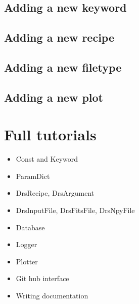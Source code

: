 \documentclass[a4paper,10pt,english]{report}
\begin{document}
\subsection{Adding a new keyword}
\label{\detokenize{dev/adding_new_keyword:adding-a-new-keyword}}\label{\detokenize{dev/adding_new_keyword:adding-new-keyword}}\label{\detokenize{dev/adding_new_keyword::doc}}

\subsection{Adding a new recipe}
\label{\detokenize{dev/adding_new_recipe:adding-a-new-recipe}}\label{\detokenize{dev/adding_new_recipe:add-new-recipe}}\label{\detokenize{dev/adding_new_recipe::doc}}

\subsection{Adding a new filetype}
\label{\detokenize{dev/adding_new_filetype:adding-a-new-filetype}}\label{\detokenize{dev/adding_new_filetype:add-new-filetype}}\label{\detokenize{dev/adding_new_filetype::doc}}

\subsection{Adding a new plot}
\label{\detokenize{dev/adding_new_plot:adding-a-new-plot}}\label{\detokenize{dev/adding_new_plot:add-new-plot}}\label{\detokenize{dev/adding_new_plot::doc}}

\section{Full tutorials}
\label{\detokenize{dev/developer_guide:full-tutorials}}\begin{itemize}
\item {} 
Const and Keyword

\item {} 
ParamDict

\item {} 
DrsRecipe, DrsArgument

\item {} 
DrsInputFile, DrsFitsFile, DrsNpyFile

\item {} 
Database

\item {} 
Logger

\item {} 
Plotter

\item {} 
Git hub interface

\item {} 
Writing documentation

\end{itemize}
\end{document}
